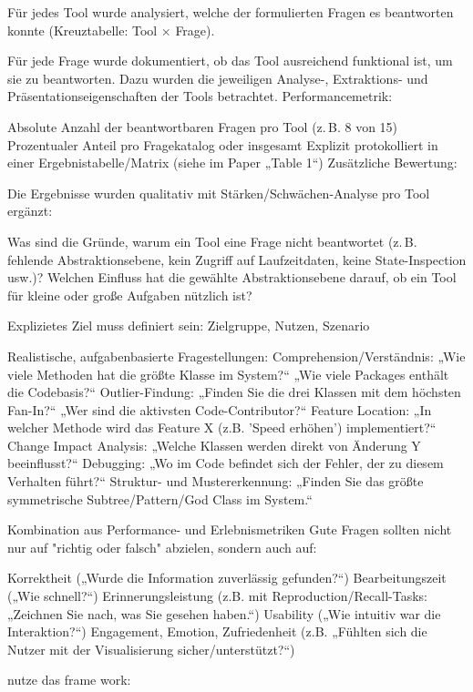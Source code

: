 Für jedes Tool wurde analysiert, welche der formulierten Fragen es beantworten konnte (Kreuztabelle: Tool × Frage).

Für jede Frage wurde dokumentiert, ob das Tool ausreichend funktional ist, um sie zu beantworten.
Dazu wurden die jeweiligen Analyse-, Extraktions- und Präsentationseigenschaften der Tools betrachtet.
Performancemetrik:

Absolute Anzahl der beantwortbaren Fragen pro Tool (z. B. 8 von 15)
Prozentualer Anteil pro Fragekatalog oder insgesamt
Explizit protokolliert in einer Ergebnistabelle/Matrix (siehe im Paper „Table 1“)
Zusätzliche Bewertung:

Die Ergebnisse wurden qualitativ mit Stärken/Schwächen-Analyse pro Tool ergänzt:

Was sind die Gründe, warum ein Tool eine Frage nicht beantwortet (z. B. fehlende Abstraktionsebene, kein Zugriff auf Laufzeitdaten, keine State-Inspection usw.)?
Welchen Einfluss hat die gewählte Abstraktionsebene darauf, ob ein Tool für kleine oder große Aufgaben nützlich ist?


\cite{slrSoftwareVisualization}
Explizietes Ziel muss definiert sein: Zielgruppe, Nutzen, Szenario

Realistische, aufgabenbasierte Fragestellungen:
Comprehension/Verständnis:
„Wie viele Methoden hat die größte Klasse im System?“
„Wie viele Packages enthält die Codebasis?“
Outlier-Findung:
„Finden Sie die drei Klassen mit dem höchsten Fan-In?“
„Wer sind die aktivsten Code-Contributor?“
Feature Location:
„In welcher Methode wird das Feature X (z.B. 'Speed erhöhen') implementiert?“
Change Impact Analysis:
„Welche Klassen werden direkt von Änderung Y beeinflusst?“
Debugging:
„Wo im Code befindet sich der Fehler, der zu diesem Verhalten führt?“
Struktur- und Mustererkennung:
„Finden Sie das größte symmetrische Subtree/Pattern/God Class im System.“



Kombination aus Performance- und Erlebnismetriken
Gute Fragen sollten nicht nur auf "richtig oder falsch" abzielen, sondern auch auf:

Korrektheit („Wurde die Information zuverlässig gefunden?“)
Bearbeitungszeit („Wie schnell?“)
Erinnerungsleistung (z.B. mit Reproduction/Recall-Tasks: „Zeichnen Sie nach, was Sie gesehen haben.“)
Usability („Wie intuitiv war die Interaktion?“)
Engagement, Emotion, Zufriedenheit (z.B. „Fühlten sich die Nutzer mit der Visualisierung sicher/unterstützt?“)




nutze das frame work: \cite{frameworkSVEval}